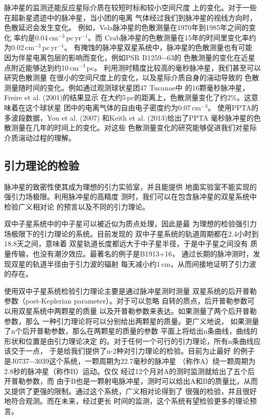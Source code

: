 脉冲星的监测还能反应星际介质在较短时标和较小空间尺度
上的变化。对于一些在超新星遗迹中的脉冲星，当小团的电离
气体经过我们到脉冲星的视线方向时，色散延迟会发生变化。
例如，Vela脉冲星的色散测量在1970年到1985年之间的变化
率约是0.04\,cm$^{-3}$\,pc\,yr$^{-1}$\supercite{hhc85}。而
Crab脉冲星的色散测量在15年的时间里变化率约为0.02\,cm$^{-3}$\,pc\,yr$^{-1}$\supercite{lps88}。
有掩蚀的脉冲星双星系统中，脉冲星的色散测量也有可能
因为伴星电离包层的影响而变化，例如PSR B1259$-$63的
色散测量的变化在近星点附近能够达到约10\,cm$^{-3}$\,pc\supercite{wjm04}。
利用测时精度比较高的毫秒脉冲星，我们甚至可以研究色散测量
在很小的空间尺度上的变化，以及星际介质自身的湍动导致的
色散测量随时间的变化。例如通过观测球状星团47 Tucanae中
的16颗毫秒脉冲星，Freire et al. (2001)\supercite{fkl+01}的结果显示
在大约5\,pc的距离上，色散测量变化了约2\%。这意味着在这个球状星
团中的电离气体的自由电子密度约为0.07\,cm$^{-3}$。
使用PPTA的多波段数据，You et al. (2007)\supercite{yhc+07}
和Keith et al. (2013)\supercite{Keith13}给出了PPTA
毫秒脉冲星的色散测量在几年的时间上的变化。对这些
色散测量变化的研究能够促进我们对星际介质湍动过程的理解。

\subsection{引力理论的检验}

脉冲星的致密性使其成为理想的引力实验室，并且能提供
地面实验室不能实现的强引力场极限。利用脉冲星的高精度
测时，我们可以在包含脉冲星的双星系统中检验广义相对论
的预言以及不同的引力理论。

双中子星系统中的中子星可以被近似为质点处理，因此是最
为理想的检验强引力场极限下的引力理论的系统。目前发现的
双中子星系统的轨道周期都在2.4小时到18.8天之间，意味着
双星轨道长度都远大于中子星半径，于是中子星之间没有
质量传输，也没有潮汐效应。最著名的例子是B1913$+$16，
通过长期的脉冲测时，发现双星的轨道半径由于引力波的辐射
每天减小约1\,cm，从而间接地证明了引力波的存在。

使用双中子星系统检验引力理论主要是通过脉冲星测时测量
双星系统的后开普勒参数（post-Keplerian parameter）。对于可以忽略
自转的质点，后开普勒参数可以用双星系统中两颗星的质量
以及开普勒参数来表达。如果测量了两个后开普勒参数，那么
一种引力理论将可以分别给出两颗星的质量。更广义地说，
如果测量了n个后开普勒参数，那么在两颗星的质量的参数
平面上将给出n条曲线，曲线的形状和位置是由引力理论决定
的。对于任何一个可行的引力理论，所有n条曲线应该交于一点，
于是给我们提供了n-2种对引力理论的检验。目前为止最好
的例子是J0737$-$3039这个系统，一颗周期为22.7毫秒的脉冲星
（称作A）绕一颗周期为2.8秒的脉冲星（称作B）运动。仅仅
经过12个月对A的测时监测就给出了五个后开普勒参数，而
由于B也是一颗射电脉冲星，测时可以给出A和B的质量比，从而
又提供了更强的限制。通过这个系统，广义相对论得到了
很强的检验，并且很好地符合观测。而在未来，经过更长
时间的监测，这个系统有望检验更多的理论预言。

